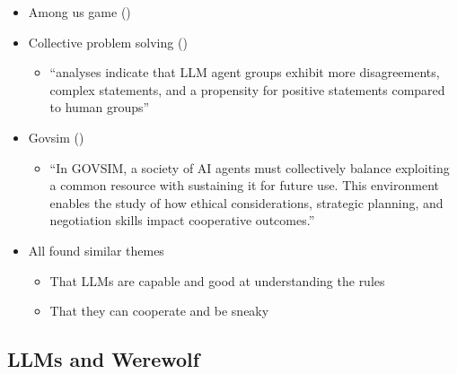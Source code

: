 \documentclass[
  letterpaper,
  DIV=11,
  numbers=noendperiod]{scrreprt}
\providecommand{\tightlist}{%
  \setlength{\itemsep}{0pt}\setlength{\parskip}{0pt}}
\begin{document}
\begin{itemize}
\tightlist
\item
  Among us game ()
\item
  Collective problem solving
  ()

  \begin{itemize}
  \tightlist
  \item
    ``analyses indicate that LLM agent groups exhibit more
    disagreements, complex statements, and a propensity for positive
    statements compared to human groups''
  \end{itemize}
\item
  Govsim ()

  \begin{itemize}
  \tightlist
  \item
    ``In GOVSIM, a society of AI agents must collectively balance
    exploiting a common resource with sustaining it for future use. This
    environment enables the study of how ethical considerations,
    strategic planning, and negotiation skills impact cooperative
    outcomes.''
  \end{itemize}
\item
  All found similar themes

  \begin{itemize}
  \tightlist
  \item
    That LLMs are capable and good at understanding the rules
  \item
    That they can cooperate and be sneaky
  \end{itemize}
\end{itemize}

\subsection{LLMs and Werewolf}\label{llms-and-werewolf}
\end{document}
